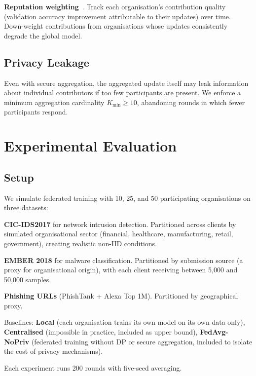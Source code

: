 \documentclass[sigconf,nonacm]{acmart}
\begin{document}
\textbf{Reputation weighting}~\cite{zhao2019reliable}. Track each
organisation's contribution quality (validation accuracy improvement
attributable to their updates) over time. Down-weight contributions from
organisations whose updates consistently degrade the global model.

\subsection{Privacy Leakage}

Even with secure aggregation, the aggregated update itself may leak
information about individual contributors if too few participants are
present. We enforce a minimum aggregation cardinality
$K_\text{min} \geq 10$, abandoning rounds in which fewer participants
respond.

\section{Experimental Evaluation}
\label{sec:results}

\subsection{Setup}

We simulate federated training with 10, 25, and 50 participating
organisations on three datasets:

\textbf{CIC-IDS2017} for network intrusion detection. Partitioned across
clients by simulated organisational sector (financial, healthcare,
manufacturing, retail, government), creating realistic non-IID conditions.

\textbf{EMBER 2018} for malware classification. Partitioned by submission
source (a proxy for organisational origin), with each client receiving
between 5{,}000 and 50{,}000 samples.

\textbf{Phishing URLs} (PhishTank + Alexa Top 1M). Partitioned by
geographical proxy.

Baselines: \textbf{Local} (each organisation trains its own model on its
own data only), \textbf{Centralised} (impossible in practice, included as
upper bound), \textbf{FedAvg-NoPriv} (federated training without DP or
secure aggregation, included to isolate the cost of privacy mechanisms).

Each experiment runs 200 rounds with five-seed averaging.
\end{document}

